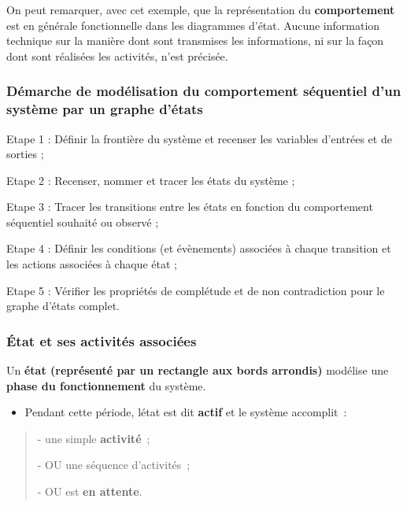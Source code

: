 On peut remarquer, avec cet exemple, que la représentation du \textbf{comportement} est en générale fonctionnelle dans les diagrammes d'état. Aucune information technique sur la manière dont sont transmises les informations, ni sur la façon dont sont réalisées les activités, n'est précisée.

\hypertarget{duxe9marche-de-moduxe9lisation-du-comportement-suxe9quentiel-dun-systuxe8me-par-un-graphe-duxe9tats}{%
\subsubsection{\texorpdfstring{D\textbf{émarche} de modélisation du comportement séquentiel d'un système par un graphe d'états}{Démarche de modélisation du comportement séquentiel d'un système par un graphe d'états}}\label{duxe9marche-de-moduxe9lisation-du-comportement-suxe9quentiel-dun-systuxe8me-par-un-graphe-duxe9tats}}

Etape 1 : Définir la frontière du système et recenser les variables d'entrées et de sorties ;

Etape 2 : Recenser, nommer et tracer les états du système ;

Etape 3 : Tracer les transitions entre les états en fonction du comportement séquentiel souhaité ou observé ;

Etape 4 : Définir les conditions (et évènements) associées à chaque transition et les actions associées à chaque état ;

Etape 5 : Vérifier les propriétés de complétude et de non contradiction pour le graphe d'états complet.

\hypertarget{uxe9tat-et-ses-activituxe9s-associuxe9es}{%
\subsubsection{État et ses activités associées}\label{uxe9tat-et-ses-activituxe9s-associuxe9es}}

Un \textbf{état (représenté par un rectangle aux bords arrondis)} modélise une \textbf{phase du fonctionnement} du système.

\begin{itemize}
\tightlist
\item
  Pendant cette période, l\textquotesingle état est dit \textbf{actif} et le système accomplit~:
\end{itemize}

\begin{quote}
- une simple \textbf{activité}~;

- OU une séquence d'activités~;

- OU est \textbf{en attente}.
\end{quote}

